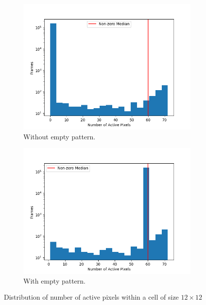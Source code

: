 \begin{figure}[H]
    \centering
    \begin{subfigure}[t]{0.5\textwidth}
        \centering
        \includegraphics[width=\textwidth]{resources/methodology/active_pixels_dist.png}
        \caption{Without empty pattern.}
        \label{fig:num_active_pixels_cell}
    \end{subfigure}%
    \begin{subfigure}[t]{0.5\textwidth}
        \centering
        \includegraphics[width=\textwidth]{resources/methodology/active_pixels_dist2.png}
        \caption{With empty pattern.}
        \label{fig:num_active_pixels_cell2}
    \end{subfigure}
    \caption{Distribution of number of active pixels within a cell of size $12\times 12$}
    \label{fig:test}
\end{figure}


